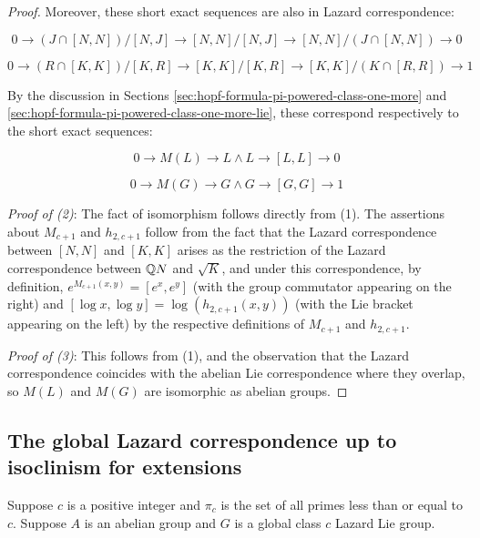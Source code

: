 \begin{proof}
  Moreover, these short exact sequences are also in Lazard
  correspondence:

  $$0 \to (J \cap [N,N])/[N,J] \to [N,N]/[N,J] \to [N,N]/(J \cap [N,N]) \to 0$$

  $$0 \to (R \cap [K,K])/[K,R] \to [K,K]/[K,R] \to [K,K]/(K \cap [R,R]) \to 1$$

  By the discussion in Sections
  \ref{sec:hopf-formula-pi-powered-class-one-more} and
  \ref{sec:hopf-formula-pi-powered-class-one-more-lie}, these
  correspond respectively to the short exact sequences:

  $$0 \to M(L) \to L \wedge L \to [L,L] \to 0$$

  $$0 \to M(G) \to G \wedge G \to [G,G] \to 1$$

  {\em Proof of (2)}: The fact of isomorphism follows directly from
  (1). The assertions about $M_{c+1}$ and $h_{2,c+1}$ follow from the
  fact that the Lazard correspondence between $[N,N]$ and $[K,K]$
  arises as the restriction of the Lazard correspondence between $\mathbb{Q}
  N$ and $\sqrt{K}$, and under this correspondence, by definition,
  $e^{M_{c+1}(x,y)} = [e^x,e^y]$ (with the group commutator appearing
  on the right) and $[\log x,\log y] = \log(h_{2,c+1}(x,y))$ (with the
  Lie bracket appearing on the left) by the respective definitions of
  $M_{c+1}$ and $h_{2,c+1}$.

  {\em Proof of (3)}: This follows from (1), and the observation that
  the Lazard correspondence coincides with the abelian Lie
  correspondence where they overlap, so $M(L)$ and $M(G)$ are
  isomorphic as abelian groups.
\end{proof}



\subsection{The global Lazard correspondence up to isoclinism for extensions}\label{sec:glcuti-extensions}

Suppose $c$ is a positive integer and $\pi_c$ is the set of all primes
less than or equal to $c$. Suppose $A$ is an abelian group and $G$ is
a global class $c$ Lazard Lie group.

